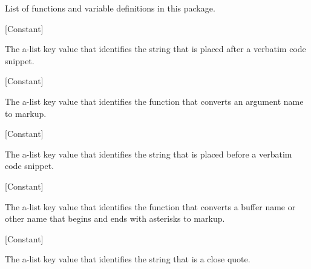 List of functions and variable definitions in this package.



\vspace{1em}
\noindent
{}
\usebox{\funcname}
 \hfill [Constant]

\begin{doc-string}
The a-list key value that identifies the string that is placed after a verbatim
code snippet.
\end{doc-string}

\vspace{1em}
\noindent
{}
\usebox{\funcname}
 \hfill [Constant]

\begin{doc-string}
The a-list key value that identifies the function that converts an argument name
to markup.
\end{doc-string}

\vspace{1em}
\noindent
{}
\usebox{\funcname}
 \hfill [Constant]

\begin{doc-string}
The a-list key value that identifies the string that is placed before a verbatim
code snippet.
\end{doc-string}

\vspace{1em}
\noindent
{}
\usebox{\funcname}
 \hfill [Constant]

\begin{doc-string}
The a-list key value that identifies the function that converts a buffer name or
other name that begins and ends with asterisks to markup.
\end{doc-string}

\vspace{1em}
\noindent
{}
\usebox{\funcname}
 \hfill [Constant]

\begin{doc-string}
The a-list key value that identifies the string that is a close quote.
\end{doc-string}

